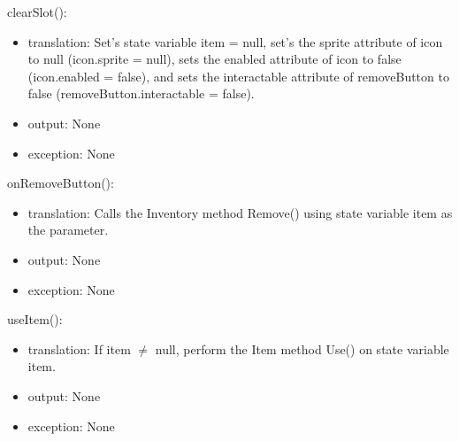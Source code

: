 \documentclass[12pt]{article}
\begin{document}
\noindent clearSlot():
\begin{itemize}
\item translation: Set's state variable item = null, set's the sprite attribute of icon to null (icon.sprite = null), sets the enabled attribute of icon to false (icon.enabled = false), and sets the interactable attribute of removeButton to false (removeButton.interactable = false).
\item output: None
\item exception: None
\end{itemize}

\noindent onRemoveButton():
\begin{itemize}
\item translation: Calls the Inventory method Remove() using state variable item as the parameter.
\item output: None
\item exception: None
\end{itemize}

\noindent useItem():
\begin{itemize}
\item translation: If item $\neq$ null, perform the Item method Use() on state variable item.
\item output: None
\item exception: None
\end{itemize}

\newpage
\end{document}

